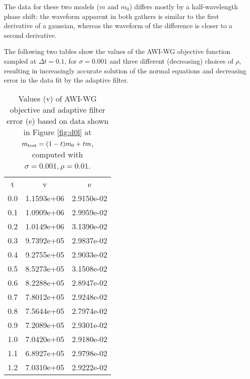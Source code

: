 The data for these two models  ($m$ and $m_0$) differs mostly by a half-wavelength phase shift: the waveform apparent in both gathers is similar to the first derivative of a gaussian, whereas the waveform of the difference is closer to a second derivative.


The following two tables show the values of the AWI-WG objective function sampled at $\Delta t = 0.1$, for $\sigma=0.001$ and three different (decreasing) choices of $\rho$, resulting in increasingly accurate solution of the normal equations and decreasing error in the data fit by the adaptive filter.

\begin{table}
  \begin{center}
  \begin{tabular}{c|c|c}
    \hline
    t & v & e \\
0.0 &  1.1593e+06 & 2.9150e-02 \\ 
0.1 & 1.0909e+06 & 2.9959e-02 \\
0.2 & 1.0149e+06 & 3.1390e-02 \\
0.3 & 9.7392e+05 & 2.9837e-02 \\
0.4 & 9.2755e+05 & 2.9033e-02 \\
0.5 & 8.5273e+05 & 3.1508e-02 \\
0.6 & 8.2288e+05 & 2.8947e-02 \\
0.7 & 7.8012e+05 & 2.9248e-02 \\
0.8 & 7.5644e+05 & 2.7974e-02 \\
0.9 & 7.2089e+05 & 2.9301e-02 \\
1.0 & 7.0420e+05 & 2.9180e-02 \\
1.1 & 6.8927e+05 & 2.9798e-02 \\
    1.2 & 7.0310e+05 & 2.9222e-02 \\
    \hline 
  \end{tabular}

  \caption{Values (v) of AWI-WG objective and adaptive filter error (e)  based on data shown in Figure \ref{fig:d0l} at $m_{\rm test} = (1-t)m_0 + t m$, computed with $\sigma=0.001, \rho = 0.01$.}
    \label{table:rho01}
  \end{center}
  \end{table}


